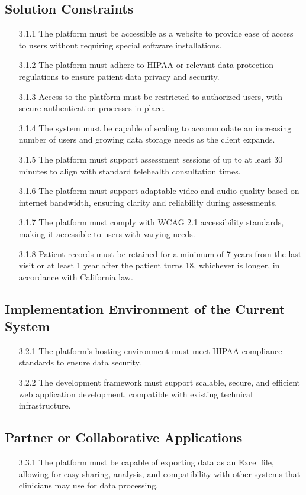 \documentclass[12pt]{article}
\begin{document}
\subsection{Solution Constraints}
\begin{itemize}
  \item[3.1.1] The platform must be accessible as a website to provide ease of access to users without requiring special software installations.
  \item[3.1.2] The platform must adhere to HIPAA or relevant data protection regulations to ensure patient data privacy and security.
  \item[3.1.3] Access to the platform must be restricted to authorized users, with secure authentication processes in place.
  \item[3.1.4] The system must be capable of scaling to accommodate an increasing number of users and growing data storage needs as the client expands.
  \item[3.1.5] The platform must support assessment sessions of up to at least 30 minutes to align with standard telehealth consultation times.
  \item[3.1.6] The platform must support adaptable video and audio quality based on internet bandwidth, ensuring clarity and reliability during assessments.
  \item[3.1.7] The platform must comply with WCAG 2.1 accessibility standards, making it accessible to users with varying needs.
  \item[3.1.8] Patient records must be retained for a minimum of 7 years from the last visit or at least 1 year after the patient turns 18, whichever is 
  longer, in accordance with California law.
\end{itemize}
\subsection{Implementation Environment of the Current System}
\begin{itemize}
  \item[3.2.1] The platform’s hosting environment must meet HIPAA-compliance standards to ensure data security.
  \item[3.2.2] The development framework must support scalable, secure, and efficient web application development, compatible with existing technical 
  infrastructure.
\end{itemize}
\subsection{Partner or Collaborative Applications}
\begin{itemize}
  \item[3.3.1] The platform must be capable of exporting data as an Excel file, allowing for easy sharing, analysis, and compatibility with other systems
  that clinicians may use for data processing.
\end{itemize}
\end{document}
